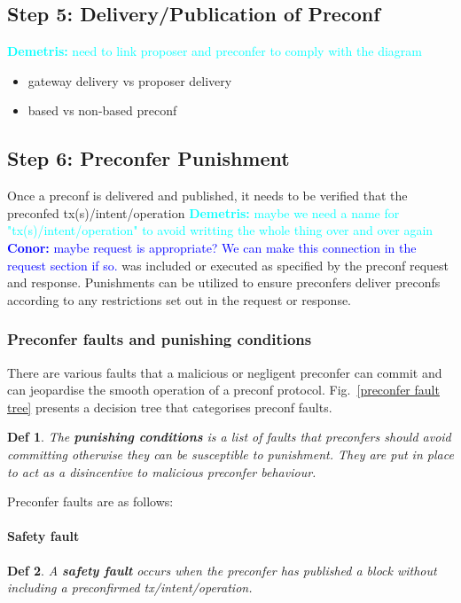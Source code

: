 \documentclass[a4paper]{article}
\theoremstyle{boldstyle}
\newtheorem*{definitionx}{Def}
\newenvironment{definition}
  {\begin{defopenboxq}\begin{definitionx}}
  {\end{definitionx}\end{defopenboxq}}
\newcommand{\cm}[1]{\textcolor{blue}{\textbf{Conor:} #1}}
\newcommand{\dk}[1]{\textcolor{cyan}{\textbf{Demetris:} #1}}
\begin{document}
\subsection{Step 5: Delivery/Publication of Preconf} \label{preconf_delivery}

\dk{need to link proposer and preconfer to comply with the diagram}

\begin{itemize}
    \item gateway delivery vs proposer delivery
    \item based vs non-based preconf
\end{itemize}
    
\subsection{Step 6: Preconfer Punishment} \label{preconfer_punishment}    
    Once a preconf is delivered and published, it needs to be verified that the preconfed tx(s)/intent/operation \dk{maybe we need a name for "tx(s)/intent/operation" to avoid writting the whole thing over and over again} \cm{maybe request is appropriate? We can make this connection in the request section if so.} was included or executed as specified by the preconf request and response. Punishments can be utilized to ensure preconfers deliver preconfs according to any restrictions set out in the request or response.
    
    \subsubsection{Preconfer faults and punishing conditions} \label{preconfer_faults_and_punishing_conditions}
    There are various faults that a malicious or negligent preconfer can commit and can jeopardise the smooth operation of a preconf protocol. Fig.~\ref{preconfer fault tree} presents a decision tree that categorises preconf faults.
    \begin{definition}
        The \textbf{punishing conditions} is a list of faults that preconfers should avoid committing otherwise they can be susceptible to punishment. They are put in place to act as a disincentive to malicious preconfer behaviour.
    \end{definition}

\vspace{5mm}
    Preconfer faults are as follows:

    \paragraph{Safety fault}
        \begin{definition}
            A \textbf{safety fault} occurs when the preconfer has published a block without including a preconfirmed tx/intent/operation. 
        \end{definition}
        
\end{document}
